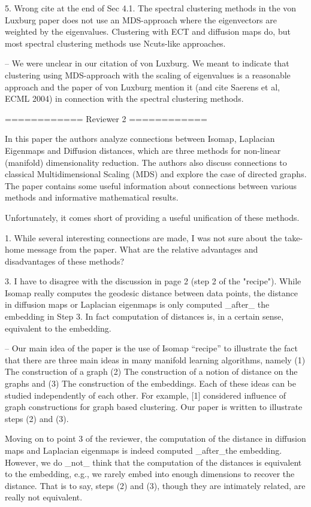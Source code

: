 5. Wrong cite at the end of Sec 4.1. The spectral clustering methods
in the von Luxburg paper does not use an MDS-approach where the
eigenvectors are weighted by the eigenvalues. Clustering with ECT and
diffusion maps do, but most spectral clustering methods use Ncuts-like
approaches.

-- We were unclear in our citation of von Luxburg. We meant to indicate that
clustering using MDS-approach with the scaling of eigenvalues is a reasonable
approach and the paper of von Luxburg mention it (and cite Saerens et al, ECML
2004) in connection with the spectral clustering methods.

============ Reviewer 2 ============

In this paper the authors analyze connections between Isomap,
Laplacian Eigenmaps and Diffusion distances, which are three methods
for non-linear (manifold) dimensionality reduction.  The authors also
discuss connections to classical Multidimensional Scaling (MDS) and
explore the case of directed graphs.  The paper contains some useful
information about connections between various methods and informative
mathematical results.

Unfortunately, it comes short of providing a useful unification of these methods.

1. While several interesting connections are made, I was not sure
about the take-home message from the paper.  What are the relative
advantages and disadvantages of these methods?

3. I have to disagree with the discussion in page 2 (step 2 of the
"recipe"). While Isomap really computes the geodesic distance between
data points, the distance in diffusion maps or Laplacian eigenmaps is
only computed _after_ the embedding in Step 3. In fact computation of
distances is, in a certain sense, equivalent to the embedding.

-- Our main idea of the paper is the use of Isomap ``recipe'' to
illustrate the fact that there are three main ideas in many manifold
learning algorithms, namely (1) The construction of a graph (2) The
construction of a notion of distance on the graphs and (3) The
construction of the embeddings. Each of these ideas can be studied
independently of each other. For example, [1] considered influence of
graph constructions for graph based clustering. Our paper is written
to illustrate steps (2) and (3).  

Moving on to point 3 of the reviewer, the computation of the distance
in diffusion maps and Laplacian eigenmaps is indeed computed
_after_the embedding. However, we do _not_ think that the computation
of the distances is equivalent to the embedding, e.g., we rarely embed
into enough dimensions to recover the distance. That is to say, steps
(2) and (3), though they are intimately related, are really not
equivalent. 

